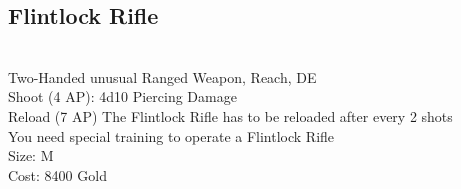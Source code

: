 \subsection{Flintlock Rifle}\label{weapon:flintlockRifle}\\
Two-Handed unusual Ranged Weapon,  Reach, DE\\
Shoot (4 AP): 4d10 Piercing Damage\\
Reload (7 AP) The Flintlock Rifle has to be reloaded after every 2 shots\\
You need special training to operate a Flintlock Rifle\\
Size: M\\
Cost: 8400 Gold\\